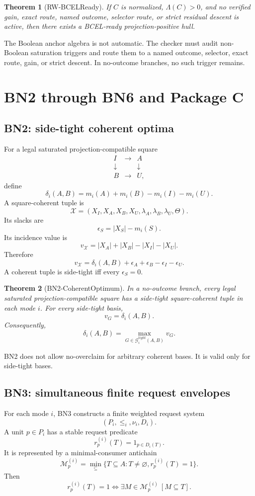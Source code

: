 \documentclass[10.5pt,a4paper]{article}
\newtheorem{theorem}{Theorem}[section]
\begin{document}
\begin{theorem}[RW-BCELReady]
If \(C\) is normalized, \(\Lambda(C)>0\), and no verified gain, exact route, named outcome, selector route, or strict residual descent is active, then there exists a BCEL-ready projection-positive hull.
\end{theorem}

The Boolean anchor algebra is not automatic. The checker must audit non-Boolean saturation triggers and route them to a named outcome, selector, exact route, gain, or strict descent. In no-outcome branches, no such trigger remains.

\section{BN2 through BN6 and Package C}

\subsection{BN2: side-tight coherent optima}
For a legal saturated projection-compatible square
\[
\begin{array}{ccc}
I & \longrightarrow & A\\
\downarrow & & \downarrow\\
B & \longrightarrow & U,
\end{array}
\]
define
\[
\delta_i(A,B)=m_i(A)+m_i(B)-m_i(I)-m_i(U).
\]
A square-coherent tuple is
\[
\mathcal X=(X_I,X_A,X_B,X_U,\lambda_A,\lambda_B,\lambda_U,\Theta).
\]
Its slacks are
\[
\epsilon_S=|X_S|-m_i(S).
\]
Its incidence value is
\[
v_{\mathcal X}=|X_A|+|X_B|-|X_I|-|X_U|.
\]
Therefore
\[
v_{\mathcal X}=\delta_i(A,B)+\epsilon_A+\epsilon_B-\epsilon_I-\epsilon_U.
\]
A coherent tuple is side-tight iff every \(\epsilon_S=0\).

\begin{theorem}[BN2-CoherentOptimum]
In a no-outcome branch, every legal saturated projection-compatible square has a side-tight square-coherent tuple in each mode \(i\). For every side-tight basis,
\[
v_G=\delta_i(A,B).
\]
Consequently,
\[
\delta_i(A,B)=\max_{G\in\mathcal G_i^{tight}(A,B)}v_G.
\]
\end{theorem}

BN2 does not allow no-overclaim for arbitrary coherent bases. It is valid only for side-tight bases.

\subsection{BN3: simultaneous finite request envelopes}
For each mode \(i\), BN3 constructs a finite weighted request system
\[
(P_i,\le_i,\nu_i,D_i).
\]
A unit \(p\in P_i\) has a stable request predicate
\[
r_p^{(i)}(T)=1_{p\in D_i(T)}.
\]
It is represented by a minimal-consumer antichain
\[
\mathcal M_p^{(i)}=\min_\subseteq\{T\subseteq A:T\ne\varnothing,
 r_p^{(i)}(T)=1\}.
\]
Then
\[
r_p^{(i)}(T)=1\Longleftrightarrow \exists M\in\mathcal M_p^{(i)}\ [M\subseteq T].
\]
\end{document}
